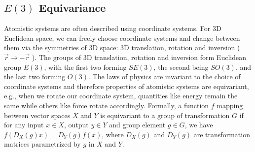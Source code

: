 
\subsection{$E(3)$ Equivariance}
\vspace{-3mm}
Atomistic systems are often described using coordinate systems.
For 3D Euclidean space, we can freely choose coordinate systems and change between them via the symmetries of 3D space: 3D translation, rotation and inversion ( $\vec{r} \rightarrow -\vec{r}$ ).
The groups of 3D translation, rotation and inversion form Euclidean group $E(3)$, with the first two forming $SE(3)$, the second being $SO(3)$, and the last two forming $O(3)$.
The laws of physics are invariant to the choice of coordinate systems and therefore properties of atomistic systems are equivariant, e.g., when we rotate our coordinate system, quantities like energy remain the same while others like force rotate accordingly.
%
Formally, a function $f$ mapping between vector spaces $X$ and $Y$ is equivariant to a group of transformation $G$ if for any input $x \in X$, output $y \in Y$ and group element $g \in G$, we have $f(D_X(g) x) = D_Y(g) f(x)$, where $D_X(g)$ and $D_Y(g)$ are transformation matrices parametrized by $g$ in $X$ and $Y$. 
